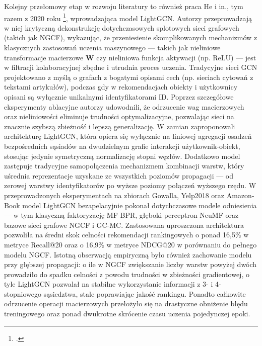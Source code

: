 Kolejny przełomowy etap w rozwoju literatury to również praca He i in., tym razem z 2020 roku \footcite{heLightGCNSimplifyingPowering2020}, wprowadzająca model LightGCN. Autorzy przeprowadzają w niej krytyczną dekonstrukcję dotychczasowych splotowych sieci grafowych (takich jak NGCF), wykazując, że przeniesienie skomplikowanych mechanizmów z klasycznych zastosowań uczenia maszynowego — takich jak nieliniowe transformacje macierzowe $\mathbf{W}$ czy nieliniowa funkcja aktywacji (np. ReLU) — jest w filtracji kolaboracyjnej zbędne i utrudnia proces uczenia. Tradycyjne sieci GCN projektowano z myślą o grafach z bogatymi opisami cech (np. sieciach cytowań z tekstami artykułów), podczas gdy w rekomendacjach obiekty i użytkownicy opisani są wyłącznie unikalnymi identyfikatorami ID. Poprzez szczegółowe eksperymenty ablacyjne autorzy udowodnili, że odrzucenie wag macierzowych oraz nieliniowości eliminuje trudności optymalizacyjne, pozwalając sieci na znacznie szybszą zbieżność i lepszą generalizację. W zamian zaproponowali architekturę LightGCN, która opiera się wyłącznie na liniowej agregacji osadzeń bezpośrednich sąsiadów na dwudzielnym grafie interakcji użytkownik-obiekt, stosując jedynie symetryczną normalizację stopni węzłów. Dodatkowo model zastępuje tradycyjne samopołączenia mechanizmem kombinacji warstw, który uśrednia reprezentacje uzyskane ze wszystkich poziomów propagacji — od zerowej warstwy identyfikatorów po wyższe poziomy połączeń wyższego rzędu. W przeprowadzonych eksperymentach na zbiorach Gowalla, Yelp2018 oraz Amazon-Book model LightGCN bezapelacyjnie pokonał dotychczasowe modele odniesienia — w tym klasyczną faktoryzację MF-BPR, głęboki perceptron NeuMF oraz bazowe sieci grafowe NGCF i GC-MC. Zastosowana uproszczona architektura pozwoliła na średni skok celności rekomendacji rankingowych o ponad 16,5\% w metryce Recall@20 oraz o 16,9\% w metryce NDCG@20 w porównaniu do pełnego modelu NGCF. Istotną obserwacją empiryczną było również zachowanie modelu przy głębszej propagacji: o ile w NGCF zwiększanie liczby warstw powyżej dwóch prowadziło do spadku celności z powodu trudności w zbieżności gradientowej, o tyle LightGCN pozwalał na stabilne wykorzystanie informacji z 3- i 4-stopniowego sąsiedztwa, stale poprawiając jakość rankingu. Ponadto całkowite odrzucenie operacji macierzowych przełożyło się na drastyczne obniżenie błędu treningowego oraz ponad dwukrotne skrócenie czasu uczenia pojedynczej epoki.

